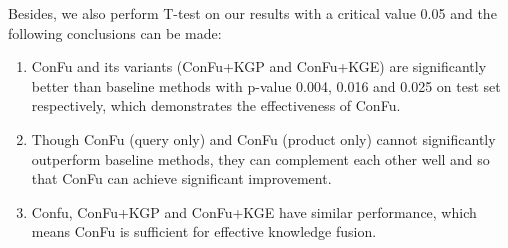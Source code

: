Besides, we also perform T-test on our results with a critical value 0.05 and the following conclusions can be made:

\begin{enumerate}
  \item ConFu and its variants (ConFu+KGP and ConFu+KGE) are significantly better than baseline methods with p-value 0.004, 0.016 and 0.025 on test set respectively, which demonstrates the effectiveness of ConFu.
  \item Though ConFu (query only) and ConFu (product only) cannot significantly outperform baseline methods, they can complement each other well and so that ConFu can achieve significant improvement.
  \item Confu, ConFu+KGP and ConFu+KGE have similar performance, which means ConFu is sufficient for effective knowledge fusion.
\end{enumerate}




